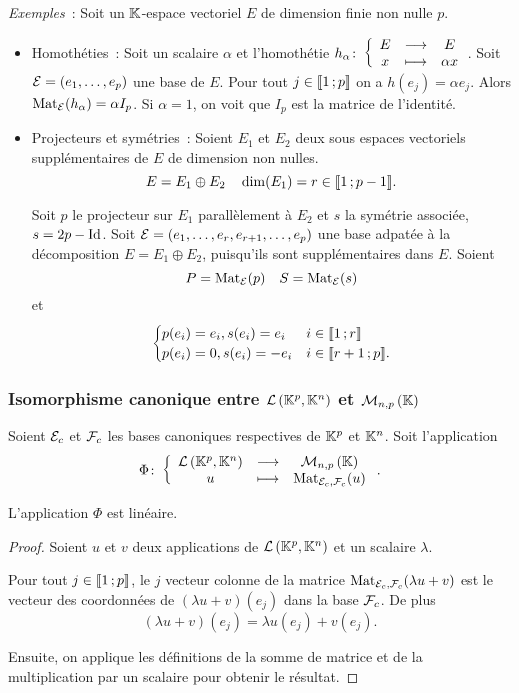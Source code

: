 \emph{Exemples}~: Soit un \(\mathbb{K}\)-espace vectoriel \(E\) de dimension finie non nulle \(p\).
\begin{itemize}
  \item Homothéties~: Soit un scalaire \(\alpha\) et l'homothétie \(h_\alpha\colon \left\{\begin{array}{ccc} E & \longrightarrow &E\\ x & \longmapsto & \alpha x \end{array} \right.\). Soit \(\mathcal{E}=(e_1,\ldots, e_p)\) une base de \(E\). Pour tout \(j \in \mathopen{\llbracket}1\mathclose{}\mathpunct{};p\mathclose{\rrbracket}\) on a \(h(e_j)=\alpha e_j\). Alors \(\mathrm{Mat}_{\mathcal{E}}(h_\alpha)=\alpha I_p\). Si \(\alpha=1\), on voit que \(I_p\) est la matrice de l'identité.
  \item Projecteurs et symétries~: Soient \(E_1\) et \(E_2\) deux sous espaces vectoriels supplémentaires de \(E\) de dimension non nulles.
    \begin{equation}
      E=E_1 \oplus E_2 \quad \dim(E_1)=r \in \mathopen{\llbracket}1\mathclose{}\mathpunct{};p-1\mathclose{\rrbracket}.
    \end{equation}

    Soit \(p\) le projecteur sur \(E_1\) parallèlement à \(E_2\) et \(s\) la symétrie associée, \(s=2p -\operatorname{Id}\). Soit \(\mathcal{E}=(e_1, \ldots, e_r, e_{r+1}, \ldots, e_p)\) une base adpatée à la décomposition \(E=E_1 \oplus E_2\), puisqu'ils sont supplémentaires dans \(E\). Soient
    \begin{equation}
      P=\mathrm{Mat}_{\mathcal{E}}(p) \quad S=\mathrm{Mat}_{\mathcal{E}}(s)
    \end{equation}
    et
    \begin{equation}
      \begin{cases}
        p(e_i)=e_i, s(e_i)=e_i & i \in \mathopen{\llbracket}1\mathclose{}\mathpunct{};r\mathclose{\rrbracket} \\
        p(e_i)=0, s(e_i)=-e_i & i \in \mathopen{\llbracket}r+1\mathclose{}\mathpunct{};p\mathclose{\rrbracket}.
      \end{cases}
    \end{equation}
\end{itemize}

\subsubsection{Isomorphisme canonique entre \(\mathcal{L}\left(\mathbb{K}^p,\mathbb{K}^n\right)\) et \(\mathcal{M}_{n,p}\left(\mathbb{K}\right)\)}


Soient \(\mathcal{E}_c\) et \(\mathcal{F}_c\) les bases canoniques respectives de \(\mathbb{K}^p\) et \(\mathbb{K}^n\). Soit l'application \[\Phi\colon \left\{\begin{array}{ccc} \mathcal{L}\left(\mathbb{K}^p,\mathbb{K}^n\right) & \longrightarrow &\mathcal{M}_{n,p}\left(\mathbb{K}\right)\\ u & \longmapsto & \mathrm{Mat}_{\mathcal{E}_c,\mathcal{F}_c}(u) \end{array} \right..\]

\begin{prop}
  L'application \(\Phi\) est linéaire.
\end{prop}
\begin{proof}
  Soient \(u\) et \(v\) deux applications de \(\mathcal{L}\left(\mathbb{K}^p,\mathbb{K}^n\right)\) et un scalaire \(\lambda\). 

  Pour tout \(j \in \mathopen{\llbracket}1\mathclose{}\mathpunct{};p\mathclose{\rrbracket}\), le \(j\)\ieme{} vecteur colonne de la matrice \(\mathrm{Mat}_{\mathcal{E}_c,\mathcal{F}_c}(\lambda u+v)\) est le vecteur des coordonnées de \((\lambda u+v)(e_j)\) dans la base \(\mathcal{F}_c\). De plus
  \begin{equation}
    (\lambda u+v)(e_j) = \lambda u(e_j) +v(e_j).
  \end{equation}

  Ensuite, on applique les définitions de la somme de matrice et de la multiplication par un scalaire pour obtenir le résultat.
\end{proof}

